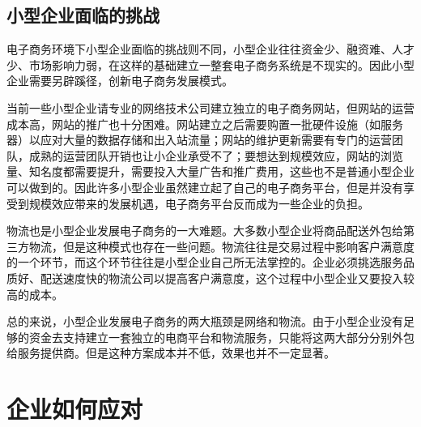 \documentclass[UTF8]{ctexart}
\begin{document}
\subsection{小型企业面临的挑战}
电子商务环境下小型企业面临的挑战则不同，小型企业往往资金少、融资难、人才少、市场影响力弱，在这样的基础建立一整套电子商务系统是不现实的。\cite{Xu}因此小型企业需要另辟蹊径，创新电子商务发展模式。\par
当前一些小型企业请专业的网络技术公司建立独立的电子商务网站，但网站的运营成本高，网站的推广也十分困难。网站建立之后需要购置一批硬件设施（如服务器）以应对大量的数据存储和出入站流量；网站的维护更新需要有专门的运营团队，成熟的运营团队开销也让小企业承受不了；要想达到规模效应，网站的浏览量、知名度都需要提升，需要投入大量广告和推广费用，这些也不是普通小型企业可以做到的。\cite{Yue}因此许多小型企业虽然建立起了自己的电子商务平台，但是并没有享受到规模效应带来的发展机遇，电子商务平台反而成为一些企业的负担。\par
物流也是小型企业发展电子商务的一大难题。大多数小型企业将商品配送外包给第三方物流，但是这种模式也存在一些问题。物流往往是交易过程中影响客户满意度的一个环节，而这个环节往往是小型企业自己所无法掌控的。企业必须挑选服务品质好、配送速度快的物流公司以提高客户满意度，这个过程中小型企业又要投入较高的成本。\par
总的来说，小型企业发展电子商务的两大瓶颈是网络和物流。由于小型企业没有足够的资金去支持建立一套独立的电商平台和物流服务，只能将这两大部分分别外包给服务提供商。但是这种方案成本并不低，效果也并不一定显著。

\section{企业如何应对}
\end{document}
